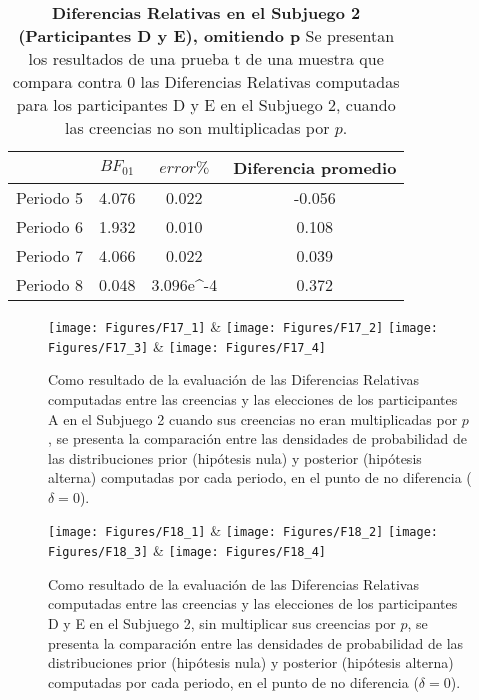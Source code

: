 \begin{table}[h]
\caption[Diferencias Relativas en el Subjuego 2, omitiendo la multiplicación por $p$; Participantes D y E (Pruebas t de una muestra)]{\textbf{Diferencias Relativas en el Subjuego 2 (Participantes D y E), omitiendo p} Se presentan los resultados de una prueba t de una muestra que compara contra 0 las Diferencias Relativas computadas para los participantes D y E en el Subjuego 2, cuando las creencias no son multiplicadas por $p$.}
\label{DRnop-S2-DyE-B}
\centering
\begin{tabular}{l | c c | c}
\toprule
\textbf{} & \textbf{$BF_{01}$} & \textbf{$error\%$} & \textbf{Diferencia promedio}\\
\midrule
Periodo 5 & 4.076 & 0.022 & -0.056\\
Periodo 6 & 1.932 & 0.010 & 0.108\\
Periodo 7 & 4.066 & 0.022 & 0.039\\
Periodo 8 & 0.048 & 3.096e^-4 & 0.372\\
\bottomrule
\end{tabular}
\end{table}
  

\begin{figure}[h]
\centering
\texttt{[image: Figures/F17\_1]} & \texttt{[image: Figures/F17\_2]} 
\texttt{[image: Figures/F17\_3]} & \texttt{[image: Figures/F17\_4]} 
\decoRule
\caption[Evaluación de las Diferencias Relativas entre creencias (omitiendo la multiplicación por $p$) y elecciones en los participantes A en el Subjuego 2 (Factor de Bayes)]{Como resultado de la evaluación de las Diferencias Relativas computadas entre las creencias y las elecciones de los participantes A en el Subjuego 2 cuando sus creencias no eran multiplicadas por $p$, se presenta la comparación entre las densidades de probabilidad de las distribuciones prior (hipótesis nula) y posterior (hipótesis alterna) computadas por cada periodo, en el punto de no diferencia ($\delta = 0$).}
\label{fig:DRnop_S2_A}
\end{figure}  


\begin{figure}[h]
\centering
\texttt{[image: Figures/F18\_1]} & \texttt{[image: Figures/F18\_2]} 
\texttt{[image: Figures/F18\_3]} & \texttt{[image: Figures/F18\_4]} 
\decoRule
\caption[Evaluación de las Diferencias Relativas entre creencias (omitiendo la multiplicación por $p$) y elecciones en los participantes D y E en el Subjuego 2 (Factor de Bayes)]{Como resultado de la evaluación de las Diferencias Relativas computadas entre las creencias y las elecciones de los participantes D y E en el Subjuego 2, sin multiplicar sus creencias por $p$, se presenta la comparación entre las densidades de probabilidad de las distribuciones prior (hipótesis nula) y posterior (hipótesis alterna) computadas por cada periodo, en el punto de no diferencia ($\delta = 0$).}
\label{fig:DRnop_S2_DyE}
\end{figure}  

